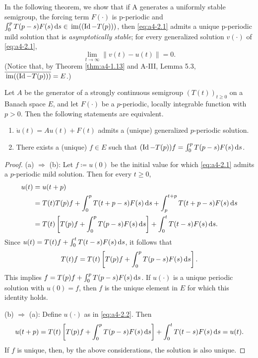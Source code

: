 In the following theorem, we show that if A generates a
uniformly stable semigroup, the forcing term $F(\cdot)$ is p-periodic
and $\int_{0}^{p} T(p-s)F(s)  \mathop{}\!\mathrm{d}{s} \in \mathop{}\mathrm{im}((\operatorname{Id} - T(p)))$, then \eqref{eq:a4-2.1}
 admits a unique p-periodic mild solution that is \emph{asymptotically stable}; \ie for every generalized solution $v(\cdot)$ of \eqref{eq:a4-2.1}, 
\[
\lim_{t \to \infty} \|v(t) - u(t)\| = 0.
\]  
(Notice that, by
Theorem \ref{thm:a4-1.13} and A-III, Lemma 5.3, $\overline{\mathop{}\mathrm{im}((\operatorname{Id} - T(p)))} = E$.)
\begin{lemma}\label{lem:a4-2.2}
Let $A$ be the generator of a strongly continuous semigroup $(T(t))_{t \geq 0}$ on a Banach space $E$, and let $F(\cdot)$ be a $p$-periodic, locally integrable function with $p > 0$. 
Then the following statements are equivalent.
\begin{enumerate}[\upshape (a)]
\item 
$\dot{u}(t) = Au(t) + F(t)$ admits a (unique) generalized $p$-periodic solution.

\item 
There exists a (unique) $f \in E$ such that $(\operatorname{Id} - T(p))f = \int_{0}^{p} T(p-s)F(s)  \mathop{}\!\mathrm{d}{s}$.
\end{enumerate}
\end{lemma}
\begin{proof}
(a) $\Rightarrow$ (b): 
Let $f \coloneqq u(0)$ be the initial value for which \eqref{eq:a4-2.1} admits a $p$-periodic mild solution. 
Then for every $t\ge 0$,
\begin{align*}
u(t) &= u(t+p) \\
&= T(t)T(p)f + \int_{0}^{p} T(t+p-s)F(s)  \mathop{}\!\mathrm{d}{s} + \int_{p}^{t+p} T(t+p-s)F(s)  \mathop{}\!\mathrm{d}{s} \\
&= T(t)\left[T(p)f + \int_{0}^{p} T(p-s)F(s)  \mathop{}\!\mathrm{d}{s}\right] + \int_{0}^{t} T(t-s)F(s)  \mathop{}\!\mathrm{d}{s}.
\end{align*}
Since $u(t) = T(t)f+\int_0^t T(t-s)F(s)\mathop{}\!\mathrm{d}{s}$, it follows that
\[T(t)f = T(t)\left[T(p)f+\int_0^pT(p-s)F(s)\mathop{}\!\mathrm{d}{s}\right].\]
This implies $f = T(p)f + \int_{0}^{p} T(p-s)F(s)  \mathop{}\!\mathrm{d}{s}$.
If $u(\cdot)$ is a unique periodic solution with $u(0) = f$, then $f$ is the unique element in $E$ for which this identity holds.

(b) $\Rightarrow$ (a):  
Define $u(\cdot)$ as in \eqref{eq:a4-2.2}. 
Then
\begin{align*}
u(t+p) = T(t)\left[T(p)f + \int_{0}^{p} T(p-s)F(s)  \mathop{}\!\mathrm{d}{s}\right] + \int_{0}^{t} T(t-s)F(s)  \mathop{}\!\mathrm{d}{s} = u(t).
\end{align*}
If $f$ is unique, then, by the above considerations, the solution is also unique.
\end{proof}
